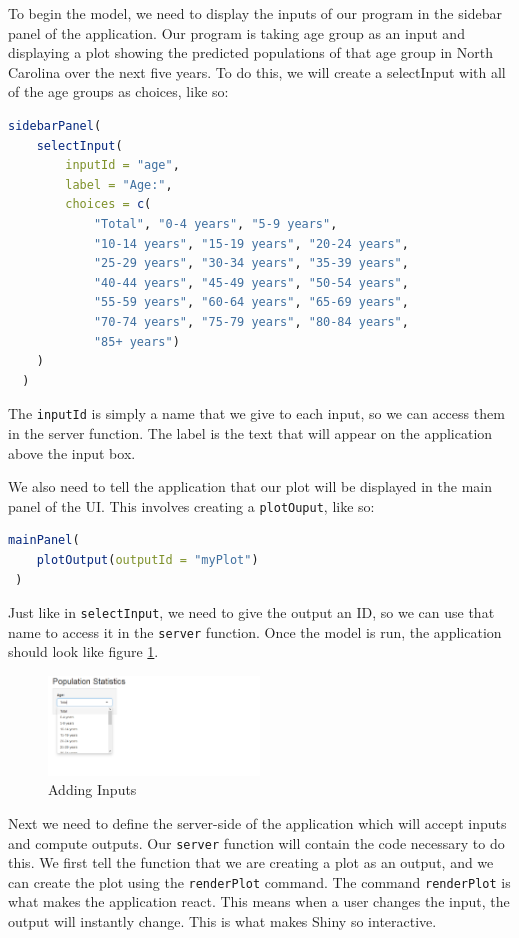 To begin the model, we need to display the inputs of our program in the sidebar panel of the application.
Our program is taking age group as an input and displaying a plot showing the predicted populations of that age group in North Carolina over the next five years.
To do this, we will create a selectInput with all of the age groups as choices, like so:
\begin{lstlisting}[language = R]
sidebarPanel(
    selectInput(
        inputId = "age", 
        label = "Age:", 
        choices = c(
            "Total", "0-4 years", "5-9 years", 
            "10-14 years", "15-19 years", "20-24 years", 
            "25-29 years", "30-34 years", "35-39 years", 
            "40-44 years", "45-49 years", "50-54 years", 
            "55-59 years", "60-64 years", "65-69 years", 
            "70-74 years", "75-79 years", "80-84 years", 
            "85+ years")
    )
  )
\end{lstlisting}
The \texttt{inputId} is simply a name that we give to each input, so we can access them in the server function.
The label is the text that will appear on the application above the input box.

We also need to tell the application that our plot will be displayed in the main panel of the UI.
This involves creating a \texttt{plotOuput}, like so: 
\begin{lstlisting}[language = R]
 mainPanel(
    plotOutput(outputId = "myPlot")
 )
\end{lstlisting}
Just like in \texttt{selectInput}, we need to give the output an ID, so we can use that name to access it in the \texttt{server} function.
Once the model is run, the application should look like figure \ref{fig:drop}. 
\begin{figure}[htbp!]
   \centering
   \includegraphics[width=0.5\textwidth]{pictures/shiny/dropdown.PNG} 
   \caption{Adding Inputs}
   \label{fig:drop}
\end{figure}
Next we need to define the server-side of the application which will accept inputs and compute outputs.
Our \texttt{server} function will contain the code necessary to do this.
We first tell the function that we are creating a plot as an output, and we can create the plot using the \texttt{renderPlot} command.
The command \texttt{renderPlot} is what makes the application react.
This means when a user changes the input, the output will instantly change.
This is what makes Shiny so interactive.

